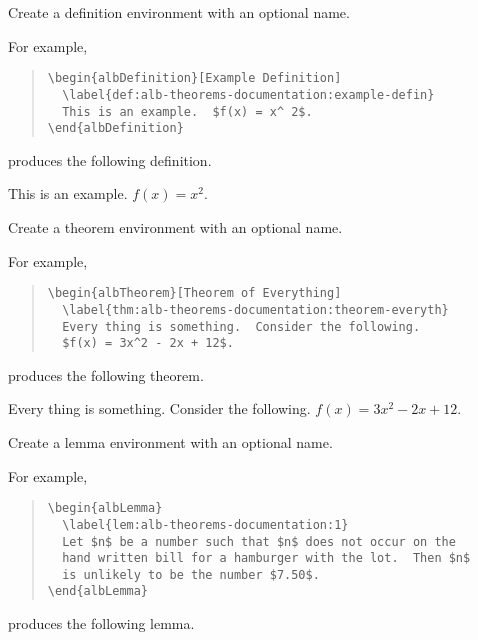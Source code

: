 \documentclass[11pt,a4paper,oneside,titlepage]{alb-corp}
\begin{document}
\begin{description}
\item[] Create a definition
  environment with an optional name.

  For example,
  \begin{quote}
\begin{verbatim}
\begin{albDefinition}[Example Definition]
  \label{def:alb-theorems-documentation:example-defin}
  This is an example.  $f(x) = x^ 2$.
\end{albDefinition}
\end{verbatim}
  \end{quote}
  produces the following definition.

  \begin{albDefinition}
    \label{def:alb-theorems-documentation:example-defin}
    This is an example.  $f(x) = x^ 2$.
  \end{albDefinition}

\item[] Create a theorem
  environment with an optional name.

  For example,
  \begin{quote}
\begin{verbatim}
\begin{albTheorem}[Theorem of Everything]
  \label{thm:alb-theorems-documentation:theorem-everyth}
  Every thing is something.  Consider the following.
  $f(x) = 3x^2 - 2x + 12$.
\end{verbatim}
  \end{quote}
  produces the following theorem.

  \begin{albTheorem}
    \label{thm:alb-theorems-documentation:theorem-everyth}
    Every thing is something.  Consider the following.  $f(x) = 3x^2 -
    2x + 12$.
  \end{albTheorem}

\item[] Create a lemma environment
  with an optional name.

  For example,
  \begin{quote}
\begin{verbatim}
\begin{albLemma}
  \label{lem:alb-theorems-documentation:1}
  Let $n$ be a number such that $n$ does not occur on the
  hand written bill for a hamburger with the lot.  Then $n$
  is unlikely to be the number $7.50$.
\end{albLemma}
\end{verbatim}
  \end{quote}
  produces the following lemma.


\end{description}
\end{document}
